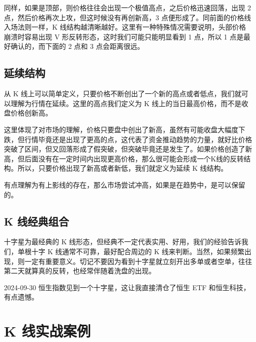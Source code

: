 同样，如果是顶部，则价格往往会出现一个极值高点，之后价格迅速回落，出现 2 点，然后价格再次上攻，但这时候没有再创新高，3 点便形成了。同前面的价格线入场法则一样，K 线结构越清晰越好。这里有一种特殊情况需要说明，头部价格崩溃时容易出现 V 形反转形态，这时我们可能只能明显看到 1 点，所以 1 点是最好确认的，而下面的 2 点和 3 点会距离很远。
\subsection{延续结构}
从 K 线上可以简单定义，只要价格不断创出了一个新的高点或者低点，我们就可以理解为行情在延续。这里的高点我们定义为 K 线上的当日最高价格，而不是收盘价格创新高。

这里体现了对市场的理解，价格只要盘中创出了新高，虽然有可能收盘大幅度下跌，但行情毕竟还是出现了更高的点，这代表了资金推动趋势的力量，就好比价格突破了区间，但又回落形成了假突破，但突破毕竟还是发生了。如果价格创造了新高，但后面没有在一定时间内出现更高价格，那么很可能会形成一个K线的反转结构。所以，只要价格出现了新高或者新低，我们就定义为延续 K 线结构。
\begin{tcolorbox}
    有点理解为有上影线的存在，那么市场尝试冲高，如果是在趋势中，是可以保留的。
\end{tcolorbox}
\subsection{K 线经典组合}

十字星为最经典的 K 线形态，但经典不一定代表实用、好用，我们的经验告诉我们，单根十字 K 线通常不可靠，最好配合周边的 K 线来判断。当然，如果频繁出现，则一定有重要意义。切记不要因为看到十字星就立刻开出多单或者空单，往往第二天就算真的反转，也经常伴随着洗盘的出现。
\begin{tcolorbox}
    2024-09-30 恒生指数见到一个十字星，这让我直接清仓了恒生 ETF 和恒生科技，有点遗憾。
\end{tcolorbox}

\section{K 线实战案例}

